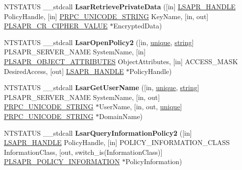 \begin{DoxyCompactItemize}
\item 
\mbox{\label{interfacelsarpc_a5c78d541401fee950b7c5a218a1c9413}} 
N\+T\+S\+T\+A\+T\+US \+\_\+\+\_\+stdcall {\bfseries Lsar\+Retrieve\+Private\+Data} (\mbox{[}in\mbox{]} \hyperlink{interfacevoid}{L\+S\+A\+P\+R\+\_\+\+H\+A\+N\+D\+LE} Policy\+Handle, \mbox{[}in\mbox{]} \hyperlink{struct___r_p_c___u_n_i_c_o_d_e___s_t_r_i_n_g}{P\+R\+P\+C\+\_\+\+U\+N\+I\+C\+O\+D\+E\+\_\+\+S\+T\+R\+I\+NG} Key\+Name, \mbox{[}in, out\mbox{]} \hyperlink{struct___l_s_a_p_r___c_r___c_i_p_h_e_r___v_a_l_u_e}{P\+L\+S\+A\+P\+R\+\_\+\+C\+R\+\_\+\+C\+I\+P\+H\+E\+R\+\_\+\+V\+A\+L\+UE} $\ast$Encrypted\+Data)
\item 
\mbox{\label{interfacelsarpc_a32d629fe4d09a65180713915e87f7ab2}} 
N\+T\+S\+T\+A\+T\+US \+\_\+\+\_\+stdcall {\bfseries Lsar\+Open\+Policy2} (\mbox{[}in, \hyperlink{interfaceunique}{unique}, \hyperlink{structstring}{string}\mbox{]} P\+L\+S\+A\+P\+R\+\_\+\+S\+E\+R\+V\+E\+R\+\_\+\+N\+A\+ME System\+Name, \mbox{[}in\mbox{]} \hyperlink{struct___l_s_a_p_r___o_b_j_e_c_t___a_t_t_r_i_b_u_t_e_s}{P\+L\+S\+A\+P\+R\+\_\+\+O\+B\+J\+E\+C\+T\+\_\+\+A\+T\+T\+R\+I\+B\+U\+T\+ES} Object\+Attributes, \mbox{[}in\mbox{]} A\+C\+C\+E\+S\+S\+\_\+\+M\+A\+SK Desired\+Access, \mbox{[}out\mbox{]} \hyperlink{interfacevoid}{L\+S\+A\+P\+R\+\_\+\+H\+A\+N\+D\+LE} $\ast$Policy\+Handle)
\item 
\mbox{\label{interfacelsarpc_ab83baad32cf674d9c32f6b9a1521079e}} 
N\+T\+S\+T\+A\+T\+US \+\_\+\+\_\+stdcall {\bfseries Lsar\+Get\+User\+Name} (\mbox{[}in, \hyperlink{interfaceunique}{unique}, \hyperlink{structstring}{string}\mbox{]} P\+L\+S\+A\+P\+R\+\_\+\+S\+E\+R\+V\+E\+R\+\_\+\+N\+A\+ME System\+Name, \mbox{[}in, out\mbox{]} \hyperlink{struct___r_p_c___u_n_i_c_o_d_e___s_t_r_i_n_g}{P\+R\+P\+C\+\_\+\+U\+N\+I\+C\+O\+D\+E\+\_\+\+S\+T\+R\+I\+NG} $\ast$User\+Name, \mbox{[}in, out, \hyperlink{interfaceunique}{unique}\mbox{]} \hyperlink{struct___r_p_c___u_n_i_c_o_d_e___s_t_r_i_n_g}{P\+R\+P\+C\+\_\+\+U\+N\+I\+C\+O\+D\+E\+\_\+\+S\+T\+R\+I\+NG} $\ast$Domain\+Name)
\item 
\mbox{\label{interfacelsarpc_ac969638df5d479c0e1c43f5297d598f8}} 
N\+T\+S\+T\+A\+T\+US \+\_\+\+\_\+stdcall {\bfseries Lsar\+Query\+Information\+Policy2} (\mbox{[}in\mbox{]} \hyperlink{interfacevoid}{L\+S\+A\+P\+R\+\_\+\+H\+A\+N\+D\+LE} Policy\+Handle, \mbox{[}in\mbox{]} P\+O\+L\+I\+C\+Y\+\_\+\+I\+N\+F\+O\+R\+M\+A\+T\+I\+O\+N\+\_\+\+C\+L\+A\+SS Information\+Class, \mbox{[}out, switch\+\_\+is(Information\+Class)\mbox{]} \hyperlink{union___l_s_a_p_r___p_o_l_i_c_y___i_n_f_o_r_m_a_t_i_o_n}{P\+L\+S\+A\+P\+R\+\_\+\+P\+O\+L\+I\+C\+Y\+\_\+\+I\+N\+F\+O\+R\+M\+A\+T\+I\+ON} $\ast$Policy\+Information)

\end{DoxyCompactItemize}
